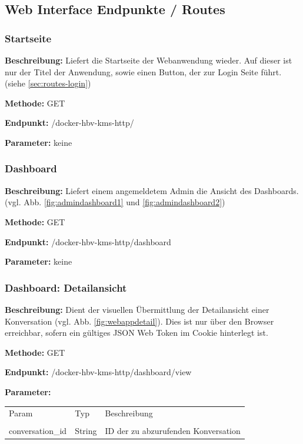 \subsection{Web Interface Endpunkte / Routes}
\label{sec:routes}
\dotfill
\subsubsection{Startseite}
\label{sec:routes-start}
\textbf{Beschreibung:} Liefert die Startseite der Webanwendung wieder. Auf dieser ist nur der Titel der Anwendung,
sowie einen Button, der zur Login Seite führt. (siehe \ref{sec:routes-login})

\textbf{Methode:} GET

\textbf{Endpunkt:} /docker-hbv-kms-http/

\textbf{Parameter:}
keine

\dotfill

\subsubsection{Dashboard}
\label{sec:routes-dashboard}
\textbf{Beschreibung:} Liefert einem angemeldetem Admin die Ansicht des Dashboards.
(vgl. Abb. \ref{fig:admindashboard1} und \ref{fig:admindashboard2})

\textbf{Methode:} GET

\textbf{Endpunkt:} /docker-hbv-kms-http/dashboard

\textbf{Parameter:}
keine

\dotfill

\subsubsection{Dashboard: Detailansicht}
\label{sec:routes-dashboard-detail}
\textbf{Beschreibung:} Dient der visuellen Übermittlung der Detailansicht einer Konversation (vgl. Abb. \ref{fig:webappdetail}).
Dies ist nur über den Browser erreichbar, sofern ein gültiges JSON Web Token im Cookie hinterlegt ist.

\textbf{Methode:} GET

\textbf{Endpunkt:} /docker-hbv-kms-http/dashboard/view

\textbf{Parameter:}
\begin{table}[H]
    \label{table:/docker-hbv-kms-http/dashboard/view}
    \setlength{\tabcolsep}{3pt}
    \begin{tabular}{p{100pt}p{80pt}p{200pt}}
        \hline
        Param            & Typ    & Beschreibung                        \\                                                             \\
        \hline
        conversation\_id & String & ID der zu abzurufenden Konversation \\
        \hline
    \end{tabular}
\end{table}
\dotfill

